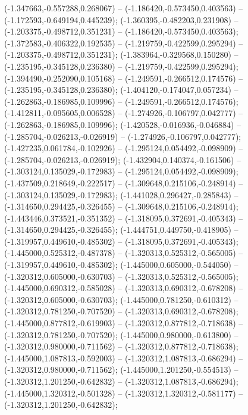  (-1.347663,-0.557288,0.268067) -- (-1.186420,-0.573450,0.403563) -- (-1.172593,-0.649194,0.445239);
 (-1.360395,-0.482203,0.231908) -- (-1.203375,-0.498712,0.351231) -- (-1.186420,-0.573450,0.403563);
 (-1.372583,-0.406322,0.192535) -- (-1.219759,-0.422599,0.295294) -- (-1.203375,-0.498712,0.351231);
 (-1.383964,-0.329568,0.150280) -- (-1.235195,-0.345128,0.236380) -- (-1.219759,-0.422599,0.295294);
 (-1.394490,-0.252090,0.105168) -- (-1.249591,-0.266512,0.174576) -- (-1.235195,-0.345128,0.236380);
 (-1.404120,-0.174047,0.057234) -- (-1.262863,-0.186985,0.109996) -- (-1.249591,-0.266512,0.174576);
 (-1.412811,-0.095605,0.006528) -- (-1.274926,-0.106797,0.042777) -- (-1.262863,-0.186985,0.109996);
 (-1.420528,-0.016936,-0.046884) -- (-1.285704,-0.026213,-0.026919) -- (-1.274926,-0.106797,0.042777);
 (-1.427235,0.061784,-0.102926) -- (-1.295124,0.054492,-0.098909) -- (-1.285704,-0.026213,-0.026919);
 (-1.432904,0.140374,-0.161506) -- (-1.303124,0.135029,-0.172983) -- (-1.295124,0.054492,-0.098909);
 (-1.437509,0.218649,-0.222517) -- (-1.309648,0.215106,-0.248914) -- (-1.303124,0.135029,-0.172983);
 (-1.441028,0.296427,-0.285843) -- (-1.314650,0.294425,-0.326455) -- (-1.309648,0.215106,-0.248914);
 (-1.443446,0.373521,-0.351352) -- (-1.318095,0.372691,-0.405343) -- (-1.314650,0.294425,-0.326455);
 (-1.444751,0.449750,-0.418905) -- (-1.319957,0.449610,-0.485302) -- (-1.318095,0.372691,-0.405343);
 (-1.445000,0.525312,-0.487378) -- (-1.320313,0.525312,-0.565005) -- (-1.319957,0.449610,-0.485302);
 (-1.445000,0.605000,-0.544050) -- (-1.320312,0.605000,-0.630703) -- (-1.320313,0.525312,-0.565005);
 (-1.445000,0.690312,-0.585028) -- (-1.320313,0.690312,-0.678208) -- (-1.320312,0.605000,-0.630703);
 (-1.445000,0.781250,-0.610312) -- (-1.320312,0.781250,-0.707520) -- (-1.320313,0.690312,-0.678208);
 (-1.445000,0.877812,-0.619903) -- (-1.320312,0.877812,-0.718638) -- (-1.320312,0.781250,-0.707520);
 (-1.445000,0.980000,-0.613800) -- (-1.320312,0.980000,-0.711562) -- (-1.320312,0.877812,-0.718638);
 (-1.445000,1.087813,-0.592003) -- (-1.320312,1.087813,-0.686294) -- (-1.320312,0.980000,-0.711562);
 (-1.445000,1.201250,-0.554513) -- (-1.320312,1.201250,-0.642832) -- (-1.320312,1.087813,-0.686294);
 (-1.445000,1.320312,-0.501328) -- (-1.320312,1.320312,-0.581177) -- (-1.320312,1.201250,-0.642832);
